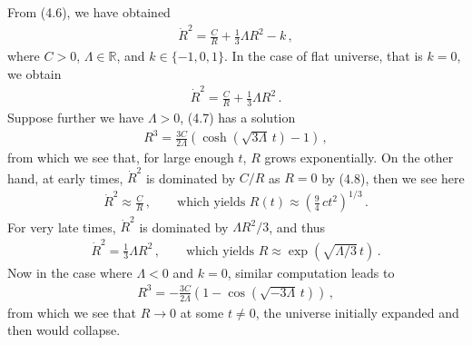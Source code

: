 \documentclass[11pt, onesided]{book}
\theoremstyle{break}
\theoremstyle{break}
\newcommand{\R}{\mathbb{R}}
\begin{document}
\newpage
From (4.6), we have obtained
\begin{align*}
\dot{R}^2 = \frac{C}{R} + \frac{1}{3}\Lambda R^2 - k\,,
\end{align*}
where $C>0$, $\Lambda \in \R$, and $k \in \{-1,0,1\}$. In the case of flat universe, that is $k = 0$, we obtain
\begin{align}
\dot{R}^2 = \frac{C}{R} + \frac{1}{3}\Lambda R^2\,.
\end{align}
Suppose further we have $\Lambda>0$, (4.7) has a solution
\begin{align}
R^3 = \frac{3C}{2\Lambda}\left( \cosh(\sqrt{3\Lambda}\, t) -1\right) \,,
\end{align}
from which we see that, for large enough $t$, $R$ grows exponentially. On the other hand, at early times, $\dot{R}^2$ is dominated by $C/R$ as $R = 0$ by (4.8), then we see here
\begin{align*}
\dot{R}^2 \approx \frac{C}{R}\,,\qquad \text{which yields }
R(t) \approx \left( \frac{9}{4}\, ct^2\right)^{1/3}\,.
\end{align*}
For very late times, $\dot{R}^2$ is dominated by $\Lambda R^2 /3$, and thus
\begin{align*}
\dot{R}^2 = \frac{1}{3}\Lambda R^2 \,,\qquad \text{which yields }
R\approx \exp\left( \sqrt{\Lambda/3 }\,t\right)\,.
\end{align*}
Now in the case where $\Lambda < 0$ and $k=0$, similar computation leads to
\begin{align}
R^3 = -\frac{3C}{2\Lambda}\left(1 - \cos(\sqrt{-3 \Lambda}\, t) \right)\,,
\end{align}
from which we see that $R \to 0$ at some $t \neq 0$, the universe initially expanded and then would collapse.
\end{document}
